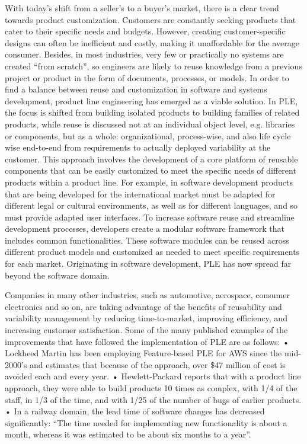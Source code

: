 \documentclass[sigconf,review]{acmart}
\begin{document}
With today's shift from a seller's to a buyer's market, there is a clear trend towards product customization. 
Customers are constantly seeking products that cater to their specific needs and budgets. 
However, creating customer-specific designs can often be inefficient and costly, making it unaffordable for the average consumer.
Besides, in most industries, very few or practically no systems are created “from scratch”, so engineers are likely to reuse knowledge from a previous project or product in the form of documents, processes, or models. 
In order to find a balance between reuse and customization in software and systems development, product line engineering has emerged as a viable solution. 
In PLE, the focus is shifted from building isolated products to building families of related products, while reuse is discussed not at an individual object level, e.g. libraries or components, but as a whole: organizational, process-wise, and also life cycle wise end-to-end from requirements to actually deployed variability at the customer. 
This approach involves the development of a core platform of reusable components that can be easily customized to meet the specific needs of different products within a product line. 
For example, in software development products that are being developed for the international market must be adapted for different legal or cultural environments, as well as for different languages, and so must provide adapted user interfaces. 
To increase software reuse and streamline development processes, developers create a modular software framework that includes common functionalities. 
These software modules can be reused across different product models and customized as needed to meet specific requirements for each market.
Originating in software development, PLE has now spread far beyond the software domain. 

Companies in many other industries, such as automotive, aerospace, consumer electronics and so on, are taking advantage of the benefits of reusability and variability management by reducing time-to-market, improving efficiency, and increasing customer satisfaction.
Some of the many published examples of the improvements that have followed the implementation of PLE are as follows:
•	Lockheed Martin has been employing Feature-based PLE for AWS since the mid-2000's and estimates that because of the approach, over \$47 million of cost is avoided each and every year.
•	Hewlett-Packard reports that with a product line approach, they were able to build products 10 times as complex, with 1/4 of the staff, in 1/3 of the time, and with 1/25 of the number of bugs of earlier products. 
•	In a railway domain, the lead time of software changes has decreased significantly: “The time needed for implementing new functionality is about a month, whereas it was estimated to be about six months to a year”. 
\end{document}
